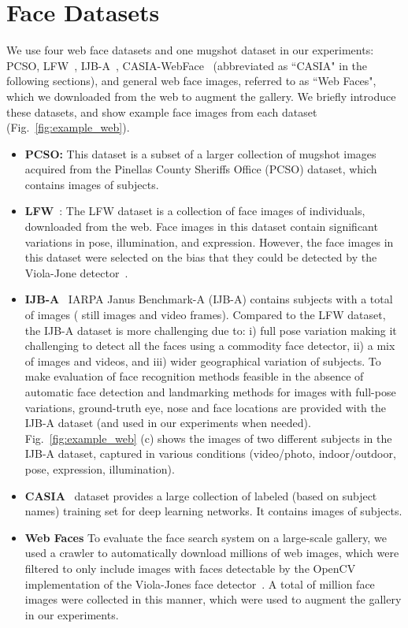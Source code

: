 \documentclass[10pt,journal,compsoc]{IEEEtran}
\begin{document}
\section{Face Datasets}\label{sec:database}
We use four web face datasets and one mugshot dataset in our experiments: PCSO, LFW~\cite{DB:LFWTech}, IJB-A~\cite{db:janus}, CASIA-WebFace~\cite{DB:CASIA} (abbreviated as ``CASIA" in the following sections), and general web face images, referred to as ``Web Faces", which we downloaded from the web to augment the gallery. We briefly introduce these datasets, and show example face images from each dataset (Fig.~\ref{fig:example_web}).
\begin{itemize}
  \item \textbf{PCSO:} This dataset is a subset of a larger collection of mugshot images acquired from the Pinellas County Sheriffs Office (PCSO) dataset, which contains  images of  subjects.
  \item \textbf{LFW}~\cite{DB:LFWTech}: The LFW dataset is a collection of  face images of  individuals, downloaded from the web. Face images in this dataset contain significant variations in pose, illumination, and expression. However, the face images in this dataset were selected on the bias that they could be detected by the Viola-Jone detector~\cite{DB:LFWTech,Viola}.
  \item \textbf{IJB-A}~\cite{db:janus} IARPA Janus Benchmark-A (IJB-A) contains  subjects with a total of  images ( still images and  video frames). Compared to the LFW dataset, the IJB-A dataset is more challenging due to: i) full pose variation making it challenging to detect all the faces using a commodity face detector, ii) a mix of images and videos, and iii) wider geographical variation of subjects. To make evaluation of face recognition methods feasible in the absence of automatic face detection and landmarking methods  for images with full-pose variations, ground-truth eye, nose and face locations are provided with the IJB-A dataset (and used in our experiments when needed). Fig.~\ref{fig:example_web} (c) shows the images of two different subjects in the IJB-A dataset, captured in various conditions (video/photo, indoor/outdoor, pose, expression, illumination).
  \item \textbf{CASIA}~\cite{DB:CASIA} dataset provides a large collection of labeled (based on subject names) training set for deep learning networks. It contains  images of  subjects.
  \item \textbf{Web Faces} To evaluate the face search system on a large-scale gallery, we used a crawler to automatically download millions of web images, which were filtered to only include images with faces detectable by the OpenCV implementation of the Viola-Jones face detector~\cite{Viola}. A total of  million face images were collected in this manner, which were used to augment the gallery in our experiments.
\end{itemize}
\end{document}
